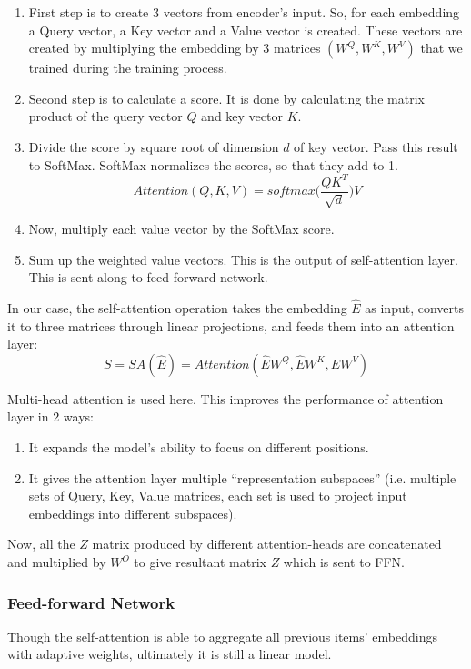 \documentclass[11pt]{article}
\begin{document}
	\begin{enumerate}
	\item First step is to create 3 vectors from encoder’s input. So, for each embedding a Query vector, a Key vector and a Value vector is created. These vectors are created by multiplying the embedding by 3 matrices $(W^{Q},W^{K},W^{V})$ that we trained during the training process.
	\item Second step is to calculate a score. It is done by calculating the matrix  product of the query vector $Q$ and key vector $K$.
	\item Divide the score by square root of dimension $d$ of key vector. Pass this result to SoftMax. SoftMax normalizes the scores, so that they add to 1.
	\[Attention (Q,K,V) = softmax\Bigg(\frac{QK^{T}}{\sqrt{d}}\Bigg)V\]

	\item Now, multiply each value vector by the SoftMax score.
	\item Sum up the weighted value vectors. This is the output of self-attention layer. This is sent along to feed-forward network.
	
	\end{enumerate}
	In our case, the self-attention operation takes
the embedding $\hat E$ as input, converts it to three matrices through
linear projections, and feeds them into an attention layer:
	\[ S = SA(\hat{E}) = Attention(\hat{E}W^{Q},\hat{E}W^{K},\hat{E}W^{V})  \]

Multi-head attention is used here. This improves the performance of attention layer in 2 ways:
\begin{enumerate}
	\item It expands the model’s ability to focus on different positions.
	\item It gives the attention layer multiple “representation subspaces” (i.e. multiple sets of Query, Key, Value matrices, each set is used to project input embeddings into different subspaces). 
\end{enumerate}
Now, all the $Z$ matrix produced by different attention-heads are concatenated and multiplied by $W^{O}$ to give resultant matrix $Z$ which is sent to FFN.

	\subsubsection{Feed-forward Network}
Though the self-attention is able to aggregate all previous items’ embeddings
with adaptive weights, ultimately it is still a linear model. 
	
\end{document}
